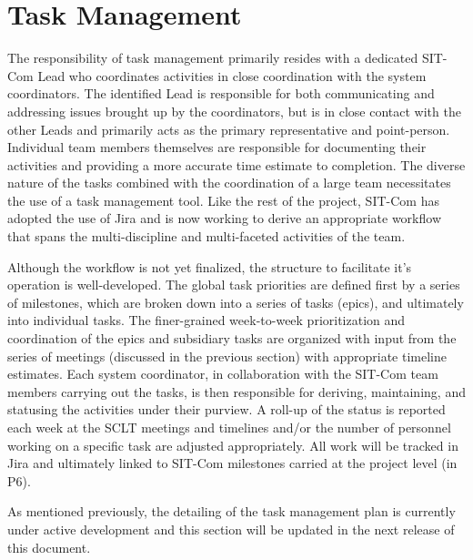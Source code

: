 \documentclass[SE,lsstdraft,authoryear,toc]{lsstdoc, lsstdraft}
\begin{document}
\section{Task Management}
\label{sec:task_management}

The responsibility of task management primarily resides with a dedicated SIT-Com Lead who coordinates activities in close coordination with the system coordinators.
The identified Lead is responsible for both communicating and addressing issues brought up by the coordinators, but is in close contact with the other Leads and primarily acts as the primary representative and point-person.
Individual team members themselves are responsible for documenting their activities and providing a more accurate time estimate to completion.
The diverse nature of the tasks combined with the coordination of a large team necessitates the use of a task management tool.
Like the rest of the project, SIT-Com has adopted the use of Jira and is now working to derive an appropriate workflow that spans the multi-discipline and multi-faceted activities of the team.

Although the workflow is not yet finalized, the structure to facilitate it's operation is well-developed.
The global task priorities are defined first by a series of milestones, which are broken down into a series of tasks (epics), and ultimately into individual tasks.
The finer-grained week-to-week prioritization and coordination of the epics and subsidiary tasks are organized with input from the series of meetings (discussed in the previous section) with appropriate timeline estimates.
Each system coordinator, in collaboration with the SIT-Com team members carrying out the tasks, is then responsible for deriving, maintaining, and statusing the activities under their purview.
A roll-up of the status is reported each week at the SCLT meetings and timelines and/or the number of personnel working on a specific task are adjusted appropriately.
All work will be tracked in Jira and ultimately linked to SIT-Com milestones carried at the project level (in P6).

As mentioned previously, the detailing of the task management plan is currently under active development and this section will be updated in the next release of this document.
\end{document}
